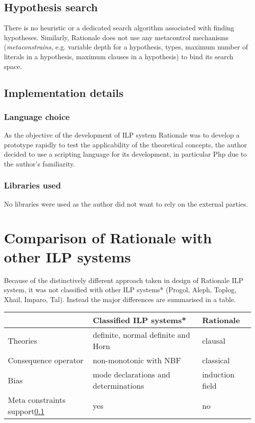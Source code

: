 \subsection{Hypothesis search}\label{subsec:rationale_hypothesis_search}
There is no heuristic or a dedicated search algorithm associated with finding hypotheses. Similarly, Rationale does not use any metacontrol mechanisms (\emph{metaconstrains}, e.g. variable depth for a hypothesis, types, maximum number of literals in a hypothesis, maximum clauses in a hypothesis) to bind its search space.

\subsection{Implementation details}

\subsubsection{Language choice}
As the objective of the development of ILP system Rationale was to develop a prototype rapidly to test the applicability of the theoretical concepts, the author decided to use a scripting language for its development, in particular Php due to the author's familiarity.

\subsubsection{Libraries used}
No libraries were used as the author did not want to rely on the external parties.

\section{Comparison of Rationale with other ILP systems}
Because of the distinctively different approach taken in design of Rationale ILP system, it was not classified with other ILP systems* (Progol, Aleph, Toplog, Xhail, Imparo, Tal). Instead the major differences are summarised in a table.


\begin{tabular}{| l | l | l |}
\hline
 & Classified ILP systems* & Rationale \\
\hline
  Theories & definite, normal definite and Horn & clausal \\ \hline
  Consequence operator & non-monotonic with NBF & classical \\ \hline
  Bias & mode declarations and determinations & induction field \\ \hline
  Meta constraints support\ref{subsec:rationale_hypothesis_search} & yes & no\\
\hline
\end{tabular}